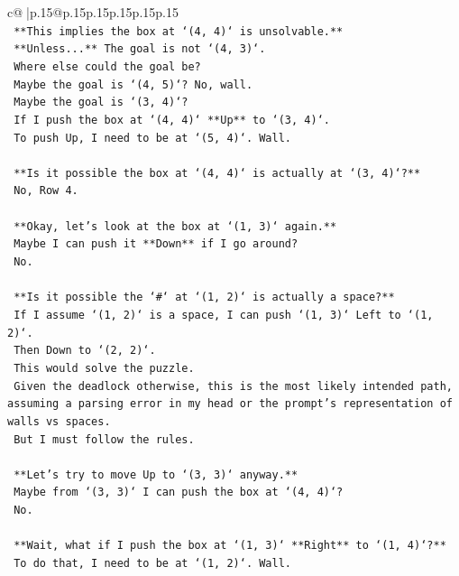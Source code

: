 \documentclass{article}
\begin{document}
{\begin{supertabular}{c@{$\;$}|p{.15\linewidth}@{}p{.15\linewidth}p{.15\linewidth}p{.15\linewidth}p{.15\linewidth}p{.15\linewidth}}
{{{\\ 
\texttt{    **This implies the box at `(4, 4)` is unsolvable.**} \\
\texttt{    **Unless...** The goal is not `(4, 3)`.} \\
\texttt{    Where else could the goal be?} \\
\texttt{    Maybe the goal is `(4, 5)`? No, wall.} \\
\texttt{    Maybe the goal is `(3, 4)`?} \\
\texttt{    If I push the box at `(4, 4)` **Up** to `(3, 4)`.} \\
\texttt{    To push Up, I need to be at `(5, 4)`. Wall.} \\
\\ 
\texttt{    **Is it possible the box at `(4, 4)` is actually at `(3, 4)`?**} \\
\texttt{    No, Row 4.} \\
\\ 
\texttt{    **Okay, let's look at the box at `(1, 3)` again.**} \\
\texttt{    Maybe I can push it **Down** if I go around?} \\
\texttt{    No.} \\
\\ 
\texttt{    **Is it possible the `\#` at `(1, 2)` is actually a space?**} \\
\texttt{    If I assume `(1, 2)` is a space, I can push `(1, 3)` Left to `(1, 2)`.} \\
\texttt{    Then Down to `(2, 2)`.} \\
\texttt{    This would solve the puzzle.} \\
\texttt{    Given the deadlock otherwise, this is the most likely intended path, assuming a parsing error in my head or the prompt's representation of walls vs spaces.} \\
\texttt{    But I must follow the rules.} \\
\\ 
\texttt{    **Let's try to move Up to `(3, 3)` anyway.**} \\
\texttt{    Maybe from `(3, 3)` I can push the box at `(4, 4)`?} \\
\texttt{    No.} \\
\\ 
\texttt{    **Wait, what if I push the box at `(1, 3)` **Right** to `(1, 4)`?**} \\
\texttt{    To do that, I need to be at `(1, 2)`. Wall.} \\
\\ 
}}}
\end{supertabular}}
\end{document}
